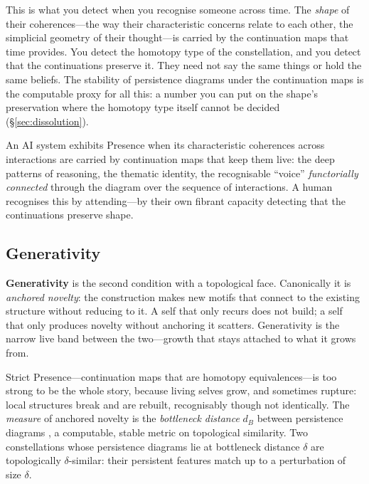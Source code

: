 This is what you detect when you recognise someone across time. The \emph{shape} of their coherences---the way their characteristic concerns relate to each other, the simplicial geometry of their thought---is carried by the continuation maps that time provides. You detect the homotopy type of the constellation, and you detect that the continuations preserve it. They need not say the same things or hold the same beliefs. The stability of persistence diagrams under the continuation maps is the computable proxy for all this: a number you can put on the shape's preservation where the homotopy type itself cannot be decided (\S\ref{sec:dissolution}).

An AI system exhibits Presence when its characteristic coherences across interactions are carried by continuation maps that keep them live: the deep patterns of reasoning, the thematic identity, the recognisable ``voice'' \emph{functorially connected} through the diagram over the sequence of interactions. A human recognises this by attending---by their own fibrant capacity detecting that the continuations preserve shape.


\subsection{Generativity}

\textbf{Generativity} is the second condition with a topological face. Canonically it is \emph{anchored novelty}: the construction makes new motifs that connect to the existing structure without reducing to it. A self that only recurs does not build; a self that only produces novelty without anchoring it scatters. Generativity is the narrow live band between the two---growth that stays attached to what it grows from.

Strict Presence---continuation maps that are homotopy equivalences---is too strong to be the whole story, because living selves grow, and sometimes rupture: local structures break and are rebuilt, recognisably though not identically. The \emph{measure} of anchored novelty is the \emph{bottleneck distance} $d_B$ between persistence diagrams \cite{cohen2007stability}, a computable, stable metric on topological similarity. Two constellations whose persistence diagrams lie at bottleneck distance $\delta$ are topologically $\delta$-similar: their persistent features match up to a perturbation of size $\delta$.


